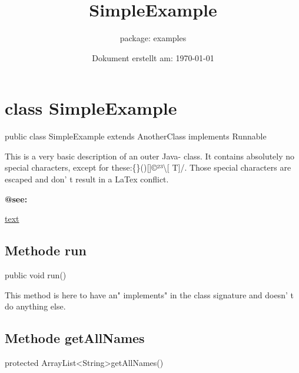 \documentclass[12pt]{scrreprt}
\title{SimpleExample}
\subtitle{package: examples}
\date{Dokument erstellt am: \today}
\begin{document}

\maketitle
\newpage


\tableofcontents
\newpage

\setcounter{page}{0}


\chapter{class SimpleExample}
\label{examples.SimpleExample}




public class SimpleExample extends AnotherClass implements Runnable


This is a very basic description of an outer Java- class. It contains absolutely no special characters, except for these:\{\}()[]©²³\textbackslash[ T]/. Those special characters are escaped and don' t result in a LaTex conflict.


\textbf{@see:}

\quad\quad \hyperref[examples.SimpleExample.My22Class:getx]{text}


\section{Methode run}
\label{examples.SimpleExample:run}




public void run()


This method is here to have an" implements" in the class signature and doesn' t do anything else.





\section{Methode getAllNames}
\label{examples.SimpleExample:getAllNames}




protected ArrayList\textless String\textgreater  getAllNames()
\end{document}
